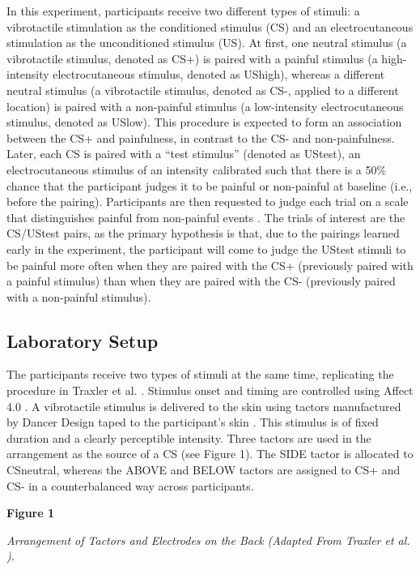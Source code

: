 \documentclass{article}
\begin{document}
In this experiment, participants receive two different types of stimuli: a vibrotactile stimulation as the conditioned stimulus (CS) and an electrocutaneous stimulation as the unconditioned stimulus (US). At first, one neutral stimulus (a vibrotactile stimulus, denoted as CS+) is paired with a painful stimulus (a high-intensity electrocutaneous stimulus, denoted as UShigh), whereas a different neutral stimulus (a vibrotactile stimulus, denoted as CS-, applied to a different location) is paired with a non-painful stimulus (a low-intensity electrocutaneous stimulus, denoted as USlow). This procedure is expected to form an association between the CS+ and painfulness, in contrast to the CS- and non-painfulness. Later, each CS is paired with a “test stimulus” (denoted as UStest), an electrocutaneous stimulus of an intensity calibrated such that there is a 50\% chance that the participant judges it to be painful or non-painful at baseline (i.e., before the pairing). Participants are then requested to judge each trial on a scale that distinguishes painful from non-painful events \autocite{bib(Maddenetal.2019)}. The trials of interest are the CS/UStest pairs, as the primary hypothesis is that, due to the pairings learned early in the experiment, the participant will come to judge the UStest stimuli to be painful more often when they are paired with the CS+ (previously paired with a painful stimulus) than when they are paired with the CS- (previously paired with a non-painful stimulus).

\subsection{Laboratory Setup}

The participants receive two types of stimuli at the same time, replicating the procedure in Traxler et al. \autocite{bib(2019)}. Stimulus onset and timing are controlled using Affect 4.0 \autocite{bib(Spruytetal.2009)}. A vibrotactile stimulus is delivered to the skin using tactors manufactured by Dancer Design taped to the participant's skin \autocite{bib(DancerDesignn.d.)}. This stimulus is of fixed duration and a clearly perceptible intensity. Three tactors are used in the arrangement as the source of a CS (see Figure 1). The SIDE tactor is allocated to CSneutral, whereas the ABOVE and BELOW tactors are assigned to CS+ and CS- in a counterbalanced way across participants.

\textbf{Figure 1}

\emph{Arrangement of Tactors and Electrodes on the Back}\emph{ }\emph{(Adapted From Traxler et al. }\autocite{bib(2019)}\emph{)}\emph{.}
\end{document}
